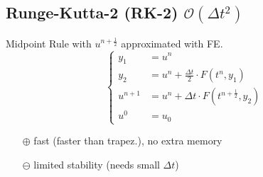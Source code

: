\subsection{Runge-Kutta-2 (RK-2) \texorpdfstring{\hfill $\mathcal{O}(\Delta t^2)$}{O(t2)}}
    \vspace{2pt}
    Midpoint Rule with $u^{n+\frac{1}{2}}$ approximated with FE.
    $$
        \begin{cases}
            y_1 &= u^n\\
            y_2 &= u^n +  \frac{\Delta t}{2} \cdot F(t^n, y_1)\\
            u^{n+1} &= u^n +  \Delta t \cdot F\left(t^{n+\frac{1}{2}}, y_2 \right)\\
            u^0 &= u_0
        \end{cases}
    $$
    \begin{itemize}
        \item[$\oplus$] fast (faster than trapez.), no extra memory
        \item[$\ominus$] limited stability (needs small $\Delta t$)
    \end{itemize}